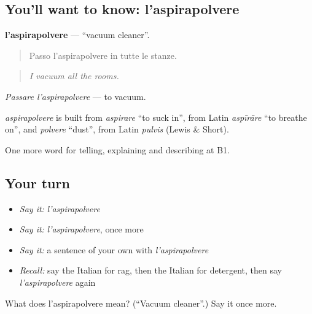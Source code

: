 \subsection*{You'll want to know: l'aspirapolvere}
\textbf{l'aspirapolvere} — \textquotedblleft{}vacuum cleaner\textquotedblright{}.

\begin{quote}
Passo l'aspirapolvere in tutte le stanze.
\end{quote}

\begin{quote}
\emph{I vacuum all the rooms.}
\end{quote}

\emph{Passare l'aspirapolvere} — to vacuum.

\begin{cousinweb}
\emph{aspirapolvere} is built from \emph{aspirare} \textquotedblleft{}to suck in\textquotedblright{}, from Latin \emph{aspīrāre} \textquotedblleft{}to breathe on\textquotedblright{}, and \emph{polvere} \textquotedblleft{}dust\textquotedblright{}, from Latin \emph{pulvis} (Lewis \& Short).
\end{cousinweb}

\begin{grammarlens}[title={What you've built}]
One more word for telling, explaining and describing at B1.
\end{grammarlens}

\subsection*{Your turn}
\begin{itemize}
\raggedright
  \item \emph{Say it:} \emph{l'aspirapolvere}
  \item \emph{Say it:} \emph{l'aspirapolvere}, once more
  \item \emph{Say it:} a sentence of your own with \emph{l'aspirapolvere}
  \item \emph{Recall:} say the Italian for rag, then the Italian for detergent, then say \emph{l'aspirapolvere} again
\end{itemize}

\begin{tcolorbox}[breakable,colback=teal!4,colframe=teal!35!black,title={Before you move on}]
What does l'aspirapolvere mean? (\textquotedblleft{}Vacuum cleaner\textquotedblright{}.) Say it once more.
\end{tcolorbox}
